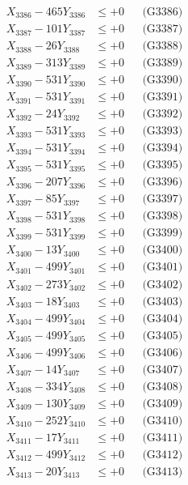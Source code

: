 \documentclass[a4paper,10pt]{article}
\begin{document}
{\begin{align}
X_{3386} - 465Y_{3386} &\leq +0 && \text{(G3386)} \\
X_{3387} - 101Y_{3387} &\leq +0 && \text{(G3387)} \\
X_{3388} - 26Y_{3388} &\leq +0 && \text{(G3388)} \\
X_{3389} - 313Y_{3389} &\leq +0 && \text{(G3389)} \\
X_{3390} - 531Y_{3390} &\leq +0 && \text{(G3390)} \\
\allowbreak
X_{3391} - 531Y_{3391} &\leq +0 && \text{(G3391)} \\
X_{3392} - 24Y_{3392} &\leq +0 && \text{(G3392)} \\
X_{3393} - 531Y_{3393} &\leq +0 && \text{(G3393)} \\
X_{3394} - 531Y_{3394} &\leq +0 && \text{(G3394)} \\
X_{3395} - 531Y_{3395} &\leq +0 && \text{(G3395)} \\
X_{3396} - 207Y_{3396} &\leq +0 && \text{(G3396)} \\
X_{3397} - 85Y_{3397} &\leq +0 && \text{(G3397)} \\
X_{3398} - 531Y_{3398} &\leq +0 && \text{(G3398)} \\
X_{3399} - 531Y_{3399} &\leq +0 && \text{(G3399)} \\
X_{3400} - 13Y_{3400} &\leq +0 && \text{(G3400)} \\
\allowbreak
X_{3401} - 499Y_{3401} &\leq +0 && \text{(G3401)} \\
X_{3402} - 273Y_{3402} &\leq +0 && \text{(G3402)} \\
X_{3403} - 18Y_{3403} &\leq +0 && \text{(G3403)} \\
X_{3404} - 499Y_{3404} &\leq +0 && \text{(G3404)} \\
X_{3405} - 499Y_{3405} &\leq +0 && \text{(G3405)} \\
X_{3406} - 499Y_{3406} &\leq +0 && \text{(G3406)} \\
X_{3407} - 14Y_{3407} &\leq +0 && \text{(G3407)} \\
X_{3408} - 334Y_{3408} &\leq +0 && \text{(G3408)} \\
X_{3409} - 130Y_{3409} &\leq +0 && \text{(G3409)} \\
X_{3410} - 252Y_{3410} &\leq +0 && \text{(G3410)} \\
\allowbreak
X_{3411} - 17Y_{3411} &\leq +0 && \text{(G3411)} \\
X_{3412} - 499Y_{3412} &\leq +0 && \text{(G3412)} \\
X_{3413} - 20Y_{3413} &\leq +0 && \text{(G3413)} \\

\end{align}}
\end{document}

